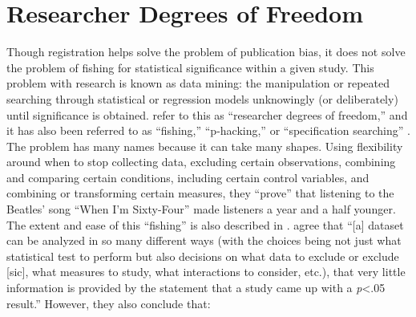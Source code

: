 \documentclass[12pt] {article}
\begin{document}
\section{Researcher Degrees of
Freedom}\label{rdof}

Though registration helps solve the problem of publication bias, it does
not solve the problem of fishing for statistical significance within a
given study. This problem with research is known as data mining: the manipulation or repeated searching through statistical or regression
models unknowingly (or deliberately) until significance is obtained.
 \cite{simmons_false-positive_2011} refer to this as
``researcher degrees of freedom,'' and it has also been referred to as
``fishing,'' ``p-hacking,'' or ``specification searching'' \citep{humphreys_fishing_2013}. The problem has many names because it can take many shapes. Using flexibility around when to stop
collecting data, excluding certain observations, combining and comparing
certain conditions, including certain control variables, and combining
or transforming certain measures, they ``prove'' that listening to the
Beatles' song ``When I'm Sixty-Four'' made listeners a year and a half
younger. The extent and ease of this ``fishing'' is also described in
\cite{humphreys_fishing_2013}. \cite{gelman_garden_2013} agree that
``{[}a{]} dataset can be analyzed in so many different ways (with the
choices being not just what statistical test to perform but also
decisions on what data to exclude or exclude {[}sic{]}, what measures to
study, what interactions to consider, etc.), that very little
information is provided by the statement that a study came up with a
\emph{p}\textless{}.05 result.'' However, they also conclude that:
\end{document}
